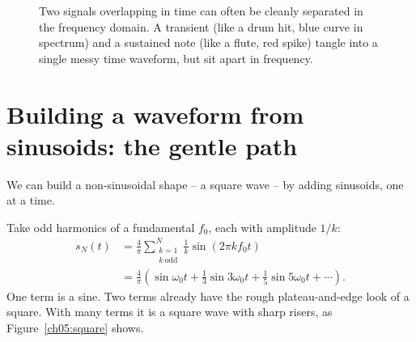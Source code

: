 \begin{figure}[H]
\centering
{}
\caption{Two signals overlapping in time can often be cleanly separated in the frequency domain. A transient (like a drum hit, blue curve in spectrum) and a sustained note (like a flute, red spike) tangle into a single messy time waveform, but sit apart in frequency.}
\label{ch05:fig-overlap}
\end{figure}

\section{Building a waveform from sinusoids: the gentle path}

We can build a non-sinusoidal shape -- a square wave -- by adding sinusoids, one at
a time.

Take odd harmonics of a fundamental $f_0$, each with amplitude $1/k$:
\begin{align*}
  s_N(t) &= \frac{4}{\pi}\sum_{\substack{k=1\\k\ \text{odd}}}^{N}
           \frac{1}{k}\sin(2\pi k f_0 t) \\
         &= \frac{4}{\pi}\!\left(\sin\omega_0 t + \tfrac13\sin 3\omega_0 t
           + \tfrac15\sin 5\omega_0 t + \cdots\right).
\end{align*}
One term is a sine. Two terms already have the rough plateau-and-edge look
of a square. With many terms it is a square wave with sharp risers, as
Figure~\ref{ch05:square} shows.

